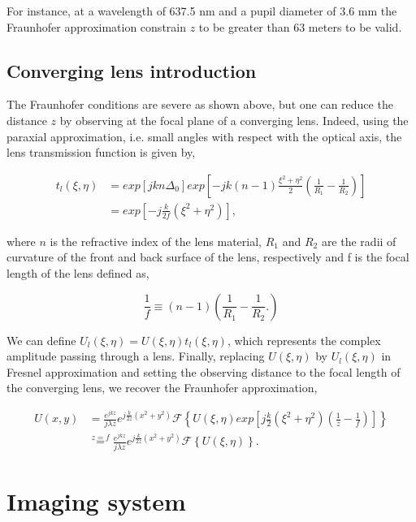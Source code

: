 For instance, at a wavelength of 637.5 nm and a pupil diameter of 3.6 mm the Fraunhofer approximation constrain $z$ to be greater than 63 meters to be valid.

\subsection{Converging lens introduction}
\label{subsec:ConvLensIntro}

The Fraunhofer conditions are severe as shown above, but one can reduce the distance $z$ by observing at the focal plane of a converging lens. Indeed, using the paraxial approximation, i.e. small angles with respect with the optical axis, the lens transmission function is given by,

\begin{align}
t_l(\xi , \eta) &= exp \left[ j k n \Delta_0 \right] exp \left[ -jk \left( n-1 \right)\frac{ \xi^2 + \eta^2 }{2}\left( \frac{1}{R_1} - \frac{1}{R_2}\right) \right] \nonumber \\ 
&= exp \left[ -j \frac{k}{2f} (\xi^2+\eta^2) \right] ,
\label{eqt:lensTl}
\end{align}

where $n$ is the refractive index of the lens material, $R_1$ and $R_2$ are the radii of curvature of the front and back surface of the lens, respectively and f is the focal length of the lens defined as,

\begin{equation}
\frac{1}{f} \equiv (n-1)\left(\frac{1}{R_1}-\frac{1}{R_2}. \right)
\label{eqt:focal_length}
\end{equation}

We can define $U_l(\xi,\eta) = U(\xi,\eta)t_l(\xi,\eta)$, which represents the complex amplitude passing through a lens. Finally, replacing $U(\xi,\eta)$ by $U_l(\xi,\eta)$ in Fresnel approximation and setting the observing distance to the focal length of the converging lens, we recover the Fraunhofer approximation,

\begin{align}
U(x,y) &= \frac{e^{jkz}}{j\lambda z} e^{j\frac{k}{2z}(x^2+y^2)}  \mathcal{F}\left\lbrace U(\xi,\eta) exp\left[j\frac{k}{2}(\xi^2+\eta^2)(\frac{1}{z}-\frac{1}{f})\right]\right\rbrace \nonumber \\
&\overset{z=f}{=} \frac{e^{jkz}}{j\lambda z} e^{j\frac{k}{2z}(x^2+y^2)}  \mathcal{F}\left\lbrace U(\xi,\eta)\right\rbrace.
\end{align}

\section{Imaging system}
\label{sec:ImSystem}


